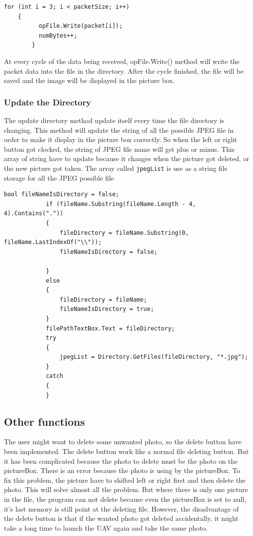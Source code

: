\begin{lstlisting}[caption={writing binary file},label=lst:writingb]          
	for (int i = 3; i < packetSize; i++)
	{
          opFile.Write(packet[i]);
          numBytes++;
    	}
\end{lstlisting}         

       At every cycle of the data being received, opFile.Write() method will write the packet data into the file in the directory. After the cycle finished, the file will be saved and the image will be displayed in the picture box. 
\subsubsection*{Update the Directory}
The update directory method update itself every time the file directory is changing. This method will update the string of all the possible JPEG file in order to make it display in the picture box correctly. So when the left or right button got clocked, the string of JPEG file name will get plus or minus. This array of string have to update because it changes when the picture got deleted, or the new picture got taken. The array called \texttt{jpegList} is use as a string file storage for all the JPEG possible file
\begin{lstlisting}[caption=update directory class highlight, label=updateD]
            bool fileNameIsDirectory = false;
            if (fileName.Substring(fileName.Length - 4, 4).Contains("."))
            {
                fileDirectory = fileName.Substring(0, fileName.LastIndexOf("\\"));
                fileNameIsDirectory = false;

            }
            else
            {
                fileDirectory = fileName;
                fileNameIsDirectory = true;
            }
            filePathTextBox.Text = fileDirectory;
            try
            {
                jpegList = Directory.GetFiles(fileDirectory, "*.jpg");
            }
            catch
            {
            }
\end{lstlisting}
\subsection{Other functions}
The user might want to delete some unwanted photo, so the delete button have been implemented. The delete button work like a normal file deleting button. But it has been complicated because the photo to delete must be the photo on the pictureBox. There is an error because the photo is using by the pictureBox. To fix this problem, the picture have to shifted left or right first and then delete the photo. This will solve almost all the problem. But where there is only one picture in the file, the program can not delete because even the pictureBox is set to null, it's last memory is still point at the deleting file. However, the disadvantage of the delete button is that if the wanted photo got deleted accidentally, it might take a long time to launch the UAV again and take the same photo.


